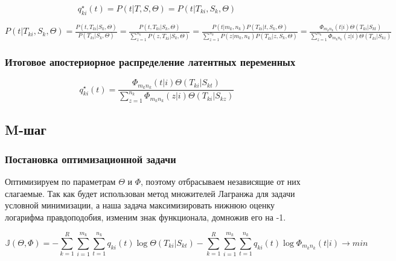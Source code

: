 \documentclass[10pt]{article}
\begin{document}
	{
		
		
		$$ q_{ki}^{\star}(t) = P(t | T, S, \Theta) = P(t | T_{ki}, S_k, \Theta) $$
		
		\large
		
		$ P(t | T_{ki}, S_k, \Theta)
		= \frac{P(t, T_{ki} | S_k, \Theta)}{P(T_{ki} | S_k, \Theta)}
		= \frac{P(t, T_{ki} | S_k, \Theta)}{\sum_{z=1}^{n_k} P(z, T_{ki} | S_k, \Theta)}
		= \frac{P(t | m_k, n_k) P(T_{ki} | t, S_k, \Theta)}{\sum_{z=1}^{n_k} P(z | m_k, n_k) P(T_{ki} | z, S_k, \Theta)}
		= \frac{\Phi_{m_kn_k} (t | i) \Theta (T_{ki} | S_{kt})}{\sum_{z=1}^{n_k} \Phi_{m_kn_k} (z | i) \Theta(T_{ki} | S_{kz})}
		$
		
	}
	
	\subsubsection*{Итоговое апостериорное распределение латентных переменных}
	
	$$ q_{ki}^{\star}(t)
	= \frac{\Phi_{m_kn_k} (t | i) \Theta (T_{ki} | S_{kt})}{\sum_{z=1}^{n_k} \Phi_{m_kn_k} (z | i) \Theta(T_{ki} | S_{kz})}
	$$
	
	
	
	\subsection*{M-шаг}
	
	\subsubsection*{Постановка оптимизационной задачи}
	
	Оптимизируем по параметрам $\Theta$ и $\Phi$, поэтому отбрасываем независящие от них слагаемые.  
	Так как будет использован метод множителей Лагранжа для задачи условной минимизации, а наша задача максимизировать нижнюю оценку логарифма правдоподобия, изменим знак функционала, домножив его на -1.  
	
	$$ \mathbb{J} (\Theta, \Phi)
	= - \sum_{k=1}^R \sum_{i=1}^{m_k} \sum_{t=1}^{n_k} q_{ki}(t) \log \Theta(T_{ki} | S_{kt})
	- \sum_{k=1}^R \sum_{i=1}^{m_k} \sum_{t=1}^{n_k} q_{ki}(t) \log 
	\Phi_{m_kn_k} (t | i)
	\rightarrow min $$
	
\end{document}
